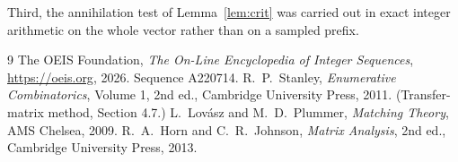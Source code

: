 \documentclass[11pt,a4paper]{article}
\theoremstyle{plain}
\theoremstyle{definition}
\begin{document}
Third, the annihilation test of Lemma~\ref{lem:crit} was carried out in exact integer
arithmetic on the whole vector rather than on a sampled prefix.

\begin{thebibliography}{9}
 The OEIS Foundation, \emph{The On-Line Encyclopedia of Integer
Sequences}, \url{https://oeis.org}, 2026. Sequence A220714.
 R.~P.~Stanley, \emph{Enumerative Combinatorics}, Volume 1, 2nd ed.,
Cambridge University Press, 2011. (Transfer-matrix method, Section 4.7.)
 L.~Lov\'asz and M.~D.~Plummer, \emph{Matching Theory}, AMS Chelsea,
2009.
 R.~A.~Horn and C.~R.~Johnson, \emph{Matrix Analysis}, 2nd ed., Cambridge
University Press, 2013.
\end{thebibliography}
\end{document}
